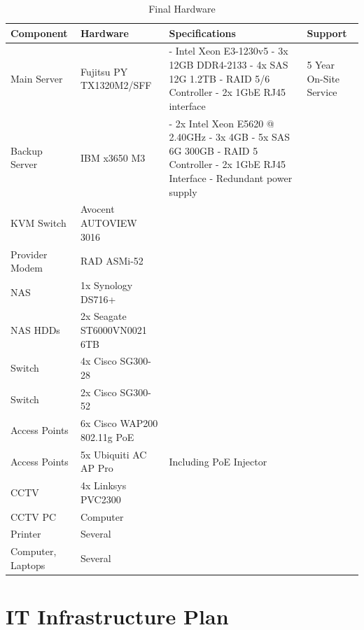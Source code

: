 \begin{table}[ht!]
\centering
\begin{tabular}{C{3cm}|C{3cm}|C{5cm}|C{2cm}}
\textbf{Component} & \textbf{Hardware} & \textbf{Specifications} & \textbf{Support} \\
\hline
Main Server & Fujitsu PY TX1320M2/SFF & - Intel Xeon E3-1230v5 \newline - 3x 12GB DDR4-2133 \newline - 4x SAS 12G 1.2TB \newline - RAID 5/6 Controller \newline - 2x 1GbE RJ45 interface & 5 Year On-Site Service \\
\hline
Backup Server & IBM x3650 M3 & - 2x Intel Xeon E5620 @ 2.40GHz \newline - 3x 4GB \newline - 5x SAS 6G 300GB \newline - RAID 5 Controller \newline - 2x 1GbE RJ45 Interface \newline - Redundant power supply & \\
\hline
KVM Switch & Avocent AUTOVIEW 3016 & \\
\hline
Provider Modem & RAD ASMi-52 & \\
\hline
NAS & 1x Synology DS716+ & & \\
\hline
NAS HDDs & 2x Seagate ST6000VN0021 6TB & & \\
\hline
Switch & 4x Cisco SG300-28 & & \\
\hline
Switch & 2x Cisco SG300-52 & & \\
\hline
Access Points & 6x Cisco WAP200 802.11g PoE &  \\
\hline
Access Points & 5x Ubiquiti AC AP Pro & Including \ac{PoE} Injector & \\
\hline
CCTV & 4x Linksys PVC2300 & \\
\hline
CCTV PC & Computer & \\
\hline
Printer & Several & \\
\hline
Computer, Laptops & Several & \\
\end{tabular} 
\caption{Final Hardware}
\label{tbl:auflistung_finaler_hardware}
\end{table}

\section{IT Infrastructure Plan}


